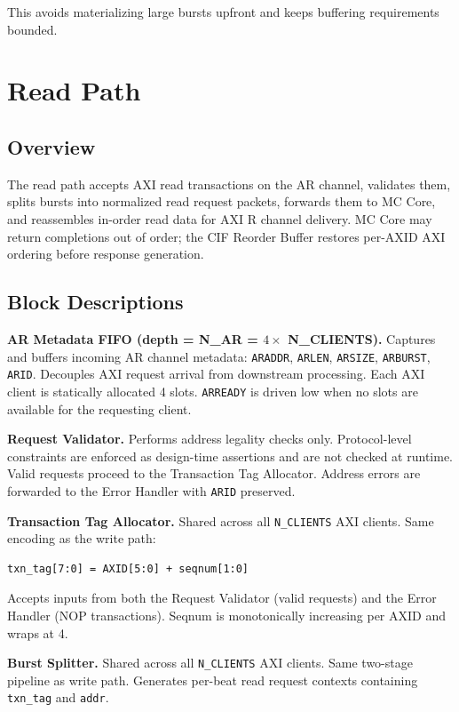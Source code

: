 \documentclass[11pt, a4paper]{article}
\begin{document}
This avoids materializing large bursts upfront and keeps buffering requirements bounded.

\section{Read Path}

\subsection{Overview}

The read path accepts AXI read transactions on the AR channel, validates them, splits bursts into normalized read request packets, forwards them to MC Core, and reassembles in-order read data for AXI R channel delivery. MC Core may return completions out of order; the CIF Reorder Buffer restores per-AXID AXI ordering before response generation.

\subsection{Block Descriptions}

\textbf{AR Metadata FIFO (depth = N\_AR = $4 \times$ N\_CLIENTS).}
Captures and buffers incoming AR channel metadata: \texttt{ARADDR}, \texttt{ARLEN}, \texttt{ARSIZE}, \texttt{ARBURST}, \texttt{ARID}. Decouples AXI request arrival from downstream processing. Each AXI client is statically allocated 4 slots. \texttt{ARREADY} is driven low when no slots are available for the requesting client.

\textbf{Request Validator.}
Performs address legality checks only. Protocol-level constraints are enforced as design-time assertions and are not checked at runtime. Valid requests proceed to the Transaction Tag Allocator. Address errors are forwarded to the Error Handler with \texttt{ARID} preserved.

\textbf{Transaction Tag Allocator.}
Shared across all \texttt{N\_CLIENTS} AXI clients. Same encoding as the write path:
\begin{lstlisting}
txn_tag[7:0] = AXID[5:0] + seqnum[1:0]
\end{lstlisting}
Accepts inputs from both the Request Validator (valid requests) and the Error Handler (NOP transactions). Seqnum is monotonically increasing per AXID and wraps at 4.

\textbf{Burst Splitter.}
Shared across all \texttt{N\_CLIENTS} AXI clients. Same two-stage pipeline as write path. Generates per-beat read request contexts containing \texttt{txn\_tag} and \texttt{addr}.
\end{document}
